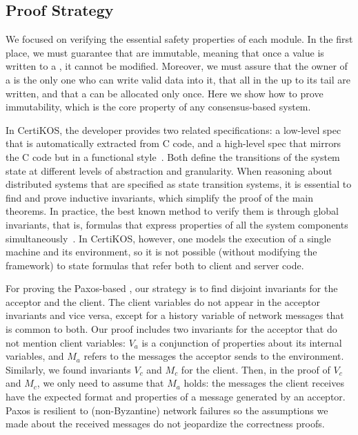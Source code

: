 \subsection{Proof Strategy}

We focused on verifying the essential safety properties of each
module. %
In the first place, we must guarantee that \WORs{} are immutable, meaning that
once a value is written to a \WOR{}, it cannot be modified.
Moreover, we must assure that the owner of a \WOS{} is the only one who can
write valid data into it, that all \WORs{} in the \WOS{} up to its tail are
written, and that a \WOS{} can be allocated only once. Here we show how to
prove immutability, which is the core property of any consensus-based system.

In CertiKOS, the developer provides two related specifications: a low-level spec
that is automatically extracted from C code, and a high-level spec that mirrors
the C code but in a functional style~\cite{deepspec}. Both define the
transitions of the system state at different levels of abstraction and
granularity. When reasoning about distributed systems that are specified as
state transition systems, it is essential to find and prove inductive
invariants, which simplify the proof of the main theorems. In practice, the best
known method to verify them is through global invariants, that is, formulas that
express properties of all the system components
simultaneously~\cite{Lamport:1977}. In CertiKOS, however, one models the
execution of a single machine and its environment, so it is not possible
(without modifying the framework) to state formulas that refer both to client
and server code.

For proving the Paxos-based \WOR{}, our strategy is to find disjoint
invariants for the acceptor and the client. The client variables do not appear
in the acceptor invariants and vice versa, except for a history variable of
network messages that is common to both. Our proof includes two invariants for
the acceptor that do not mention client variables: $V_a$ is a conjunction of
properties about its internal variables, and $M_a$ refers to the messages the
acceptor sends to the environment. Similarly, we found invariants $V_c$ and
$M_c$ for the client. Then, in the proof of $V_c$ and $M_c$, we only need to
assume that $M_a$ holds: the messages the client receives have the expected
format and properties of a message generated by an acceptor. Paxos is resilient
to (non-Byzantine) network failures so the assumptions we made about the
received messages do not jeopardize the correctness proofs.

